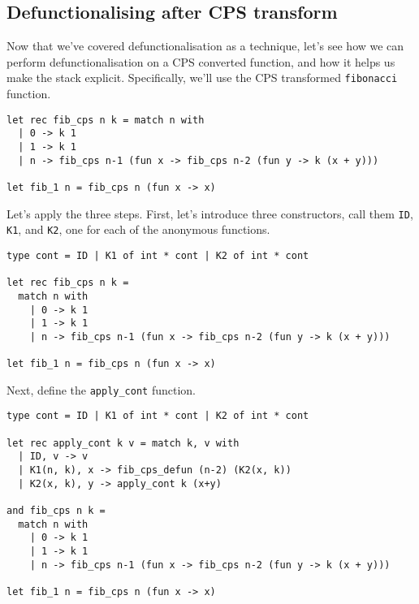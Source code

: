 \subsection{Defunctionalising after CPS transform}\label{subsection:defun-with-cps}
Now that we've covered defunctionalisation as a technique, let's see how we can perform defunctionalisation on a CPS converted function, and how it helps us make the stack explicit. Specifically, we'll use the CPS transformed \texttt{fibonacci} function.

\begin{code}
\label{code:defun-fib-0}
\begin{verbatim}
let rec fib_cps n k = match n with
  | 0 -> k 1
  | 1 -> k 1
  | n -> fib_cps n-1 (fun x -> fib_cps n-2 (fun y -> k (x + y)))

let fib_1 n = fib_cps n (fun x -> x)
\end{verbatim}
\end{code}

Let's apply the three steps. First, let's introduce three constructors, call them \texttt{ID}, \texttt{K1}, and \texttt{K2}, one for each of the anonymous functions. 

\begin{code}
\label{code:defun-fib-1}
\begin{verbatim}
type cont = ID | K1 of int * cont | K2 of int * cont

let rec fib_cps n k = 
  match n with
    | 0 -> k 1
    | 1 -> k 1
    | n -> fib_cps n-1 (fun x -> fib_cps n-2 (fun y -> k (x + y)))

let fib_1 n = fib_cps n (fun x -> x)
\end{verbatim}
\end{code}

Next, define the \texttt{apply\_cont} function. 

\begin{code}
\label{code:defun-fib-1}
\begin{verbatim}
type cont = ID | K1 of int * cont | K2 of int * cont

let rec apply_cont k v = match k, v with
  | ID, v -> v
  | K1(n, k), x -> fib_cps_defun (n-2) (K2(x, k))
  | K2(x, k), y -> apply_cont k (x+y)

and fib_cps n k = 
  match n with
    | 0 -> k 1
    | 1 -> k 1
    | n -> fib_cps n-1 (fun x -> fib_cps n-2 (fun y -> k (x + y)))

let fib_1 n = fib_cps n (fun x -> x)
\end{verbatim}
\end{code}

